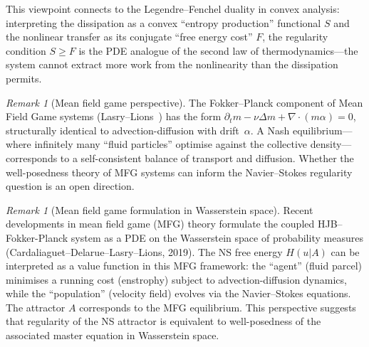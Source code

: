 \documentclass[12pt,a4paper]{article}
\theoremstyle{definition}
\theoremstyle{plain}
\theoremstyle{remark}
\newtheorem{remark}[definition]{Remark}
\begin{document}
This viewpoint connects to the Legendre--Fenchel duality in convex analysis: interpreting the dissipation as a convex ``entropy production'' functional $S$ and the nonlinear transfer as its conjugate ``free energy cost'' $F$, the regularity condition $S \ge F$ is the PDE analogue of the second law of thermodynamics---the system cannot extract more work from the nonlinearity than the dissipation permits.

\begin{remark}[Mean field game perspective]
The Fokker--Planck component of Mean Field Game systems
(Lasry--Lions~\cite{LasryLions2007}) has the form
$\partial_t m - \nu\Delta m + \nabla\cdot(m\alpha) = 0$,
structurally identical to advection-diffusion with drift~$\alpha$.
A Nash equilibrium---where infinitely many ``fluid particles'' optimise
against the collective density---corresponds to a self-consistent
balance of transport and diffusion.  Whether the well-posedness theory
of MFG systems can inform the Navier--Stokes regularity question is an
open direction.
\end{remark}

\begin{remark}[Mean field game formulation in Wasserstein space]
\label{rem:mfg-wasserstein}
Recent developments in mean field game (MFG) theory formulate the coupled HJB--Fokker-Planck system as a PDE on the Wasserstein space of probability measures (Cardaliaguet--Delarue--Lasry--Lions, 2019). The NS free energy $H(u|A)$ can be interpreted as a value function in this MFG framework: the ``agent'' (fluid parcel) minimises a running cost (enstrophy) subject to advection-diffusion dynamics, while the ``population'' (velocity field) evolves via the Navier--Stokes equations. The attractor $A$ corresponds to the MFG equilibrium. This perspective suggests that regularity of the NS attractor is equivalent to well-posedness of the associated master equation in Wasserstein space.
\end{remark}
\end{document}
